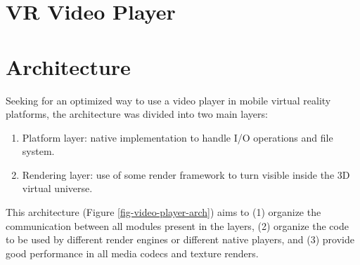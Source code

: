 \documentclass[runningheads]{llncs}
\begin{document}



\section{VR Video Player}


\section{Architecture}


Seeking for an optimized way to use a video player in mobile virtual reality platforms, the architecture was divided into two main layers:

\begin{enumerate}
    \item Platform layer: native implementation to handle I/O operations and file system.
    \item Rendering layer: use of some render framework to turn visible inside the 3D virtual universe.
\end{enumerate}

This architecture (Figure \ref{fig-video-player-arch}) aims to (1) organize the communication between all modules present in the layers, (2) organize the code to be used by different render engines or different native players, and (3) provide good performance in all media codecs and texture renders.

\end{document}
